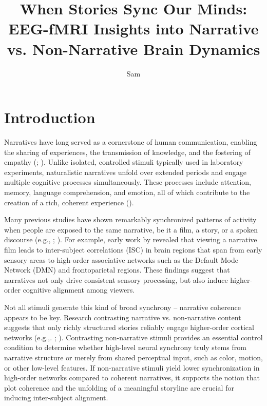 \documentclass[stu,12pt,floatsintext]{apa7}
\title{When Stories Sync Our Minds: EEG-fMRI Insights into Narrative vs. Non-Narrative Brain Dynamics}
\author{Sam}
\affiliation{University of Chicago}
\begin{document}
\maketitle

\section{Introduction}
Narratives have long served as a cornerstone of human communication, enabling the sharing of experiences, the transmission of knowledge, and the fostering of empathy (\cite{jaaskelainen_neural_2020}; \cite{nguyen_shared_2019}). Unlike isolated, controlled stimuli typically used in laboratory experiments, naturalistic narratives unfold over extended periods and engage multiple cognitive processes simultaneously. These processes include attention, memory, language comprehension, and emotion, all of which contribute to the creation of a rich, coherent experience (\cite{regev_propagation_2019}).

Many previous studies have shown remarkably synchronized patterns of activity when people are exposed to the same narrative, be it a film, a story, or a spoken discourse (e.g., \cite{nastase_measuring_2019}; \cite{yeshurun_same_2017}). For example, early work by \textcite{hasson_enhanced_2008} revealed that viewing a narrative film leads to inter-subject correlations (ISC) in brain regions that span from early sensory areas to high-order associative networks such as the Default Mode Network (DMN) and frontoparietal regions. These findings suggest that narratives not only drive consistent sensory processing, but also induce higher-order cognitive alignment among viewers.

Not all stimuli generate this kind of broad synchrony – narrative coherence appears to be key. Research contrasting narrative vs. non-narrative content suggests that only richly structured stories reliably engage higher-order cortical networks (e.g.,. \cite{dini_higher_2023}; \cite{naci_common_2014}). Contrasting non-narrative stimuli provides an essential control condition to determine whether high-level neural synchrony truly stems from narrative structure or merely from shared perceptual input, such as color, motion, or other low-level features. If non-narrative stimuli yield lower synchronization in high-order networks compared to coherent narratives, it supports the notion that plot coherence and the unfolding of a meaningful storyline are crucial for inducing inter-subject alignment.
\end{document}

